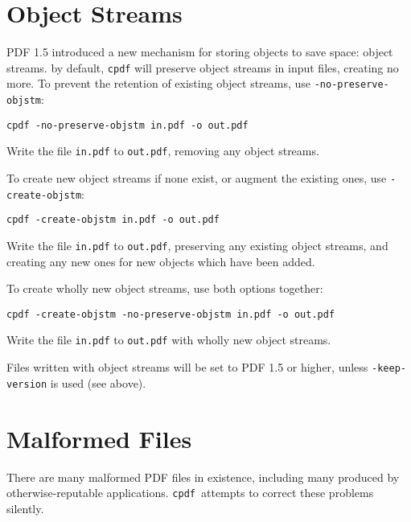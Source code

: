 \documentclass{book}
\newcommand{\cpdf}{\texttt{cpdf}}
\begin{document}
\section{Object Streams}
PDF 1.5 introduced a new mechanism for storing objects to save space: object streams. by default, \texttt{cpdf} will preserve object streams in input files, creating no more. To prevent the retention of existing object streams, use \texttt{-no-preserve-objstm}:

\begin{framed}
\small\verb!cpdf -no-preserve-objstm in.pdf -o out.pdf!

\vspace{2.5mm}
\noindent Write the file \texttt{in.pdf} to \texttt{out.pdf}, removing any object streams.
\end{framed}

\noindent To create new object streams if none exist, or augment the existing ones, use \texttt{-create-objstm}:

\begin{framed}
\small\verb!cpdf -create-objstm in.pdf -o out.pdf!

\vspace{2.5mm}
\noindent Write the file \texttt{in.pdf} to \texttt{out.pdf}, preserving any existing object streams, and creating any new ones for new objects which have been added.
\end{framed}

\noindent To create wholly new object streams, use both options together:

\begin{framed}
\small\verb!cpdf -create-objstm -no-preserve-objstm in.pdf -o out.pdf!

\vspace{2.5mm}
\noindent Write the file \texttt{in.pdf} to \texttt{out.pdf} with wholly new object streams.
\end{framed}

\noindent Files written with object streams will be set to PDF 1.5 or higher, unless \texttt{-keep-version} is used (see above).

\section{Malformed Files}
\label{fast}
There are many malformed PDF files in existence, including many produced by
otherwise-reputable applications. \cpdf\ attempts to correct these problems
silently.
\end{document}
